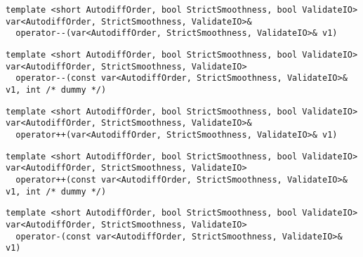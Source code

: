 \begin{tcolorbox}[colback=white,colframe=gray90, coltitle=black,boxrule=3pt,
fonttitle=\bfseries,title= Operator Unary Decrement]

\begin{verbatim}
template <short AutodiffOrder, bool StrictSmoothness, bool ValidateIO>
var<AutodiffOrder, StrictSmoothness, ValidateIO>&
  operator--(var<AutodiffOrder, StrictSmoothness, ValidateIO>& v1)

\end{verbatim}

\begin{verbatim}
template <short AutodiffOrder, bool StrictSmoothness, bool ValidateIO>
var<AutodiffOrder, StrictSmoothness, ValidateIO>
  operator--(const var<AutodiffOrder, StrictSmoothness, ValidateIO>& v1, int /* dummy */)

\end{verbatim}

\end{tcolorbox}

\begin{tcolorbox}[colback=white,colframe=gray90, coltitle=black,boxrule=3pt,
fonttitle=\bfseries,title= Operator Unary Increment]

\begin{verbatim}
template <short AutodiffOrder, bool StrictSmoothness, bool ValidateIO>
var<AutodiffOrder, StrictSmoothness, ValidateIO>&
  operator++(var<AutodiffOrder, StrictSmoothness, ValidateIO>& v1)

\end{verbatim}

\begin{verbatim}
template <short AutodiffOrder, bool StrictSmoothness, bool ValidateIO>
var<AutodiffOrder, StrictSmoothness, ValidateIO>
  operator++(const var<AutodiffOrder, StrictSmoothness, ValidateIO>& v1, int /* dummy */)

\end{verbatim}

\end{tcolorbox}

\begin{tcolorbox}[colback=white,colframe=gray90, coltitle=black,boxrule=3pt,
fonttitle=\bfseries,title= Operator Unary Minus]

\begin{verbatim}
template <short AutodiffOrder, bool StrictSmoothness, bool ValidateIO>
var<AutodiffOrder, StrictSmoothness, ValidateIO>
  operator-(const var<AutodiffOrder, StrictSmoothness, ValidateIO>& v1)

\end{verbatim}

\end{tcolorbox}

